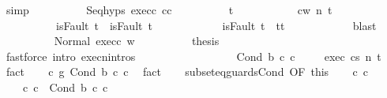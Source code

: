 \begin{isabellebody}
\ simp\isanewline
\ \ \ \ \ \ \ \ \isamarkupfalse%
\ Seq{\isachardot}hyps\ exec{\isacharunderscore}c{}\ c{}{\isacharunderscore}c{}{\isacharprime}\isanewline
\ \ \ \ \ \ \ \ \isamarkupfalse%
\ t{\isacharprime}\ \isanewline
\ \ \ \ \ \ \ \ \ \ {\isachardoublequoteopen}{\isasymGamma}{\isasymturnstile}{\isasymlangle}c{}{\isacharprime}{\isacharcomma}w{\isasymrangle}\ {\isacharequal}n{\isasymRightarrow}\ t{\isacharprime}{\isachardoublequoteclose}\ \isanewline
\ \ \ \ \ \ \ \ \ \ {\isachardoublequoteopen}isFault\ t\ {\isasymlongrightarrow}\ isFault\ t{\isacharprime}{\isachardoublequoteclose}\ \isanewline
\ \ \ \ \ \ \ \ \ \ {\isachardoublequoteopen}{\isasymnot}\ isFault\ t{\isacharprime}\ {\isasymlongrightarrow}\ t{\isacharprime}{\isacharequal}t{\isachardoublequoteclose}\isanewline
\ \ \ \ \ \ \ \ \ \ \isamarkupfalse%
\ blast\isanewline
\ \ \ \ \ \ \ \ \isamarkupfalse%
\ Normal\ exec{\isacharunderscore}c{}{\isacharprime}\ w{\isacharprime}\isanewline
\ \ \ \ \ \ \ \ \isamarkupfalse%
\ {\isacharquery}thesis\isanewline
\ \ \ \ \ \ \ \ \ \ \isamarkupfalse%
\ {\isacharparenleft}fastforce\ intro{\isacharcolon}\ execn{\isachardot}intros{\isacharparenright}\isanewline
\ \ \ \ \ \ \isamarkupfalse%
\isanewline
\ \ \ \ \isamarkupfalse%
\isanewline
\ \ \isamarkupfalse%
\isanewline
{}\isamarkupfalse%
\isanewline
\ \ \isamarkupfalse%
\ {\isacharparenleft}Cond\ b\ c{}{\isacharprime}\ c{}{\isacharprime}{\isacharparenright}\ \isanewline
\ \ \isamarkupfalse%
\ exec{\isacharcolon}\ {\isachardoublequoteopen}{\isasymGamma}{\isasymturnstile}{\isasymlangle}c{\isacharcomma}s{\isasymrangle}\ {\isacharequal}n{\isasymRightarrow}\ t{\isachardoublequoteclose}\ \isamarkupfalse%
\ fact\isanewline
\ \ \isamarkupfalse%
\ {\isachardoublequoteopen}c\ {\isasymsubseteq}\isactrlsub g\ Cond\ b\ c{}{\isacharprime}\ c{}{\isacharprime}{\isachardoublequoteclose}\ \isamarkupfalse%
\ fact\isanewline
\ \ \isamarkupfalse%
\ subseteq{\isacharunderscore}guards{\isacharunderscore}Cond\ {\isacharbrackleft}OF\ this{\isacharbrackright}\isanewline
\ \ \isamarkupfalse%
\ c{}\ c{}\ \isanewline
\ \ \ \ c{\isacharcolon}\ {\isachardoublequoteopen}c\ {\isacharequal}\ Cond\ b\ c{}\ c{}{\isachardoublequoteclose}\ \isanewline

\end{isabellebody}
